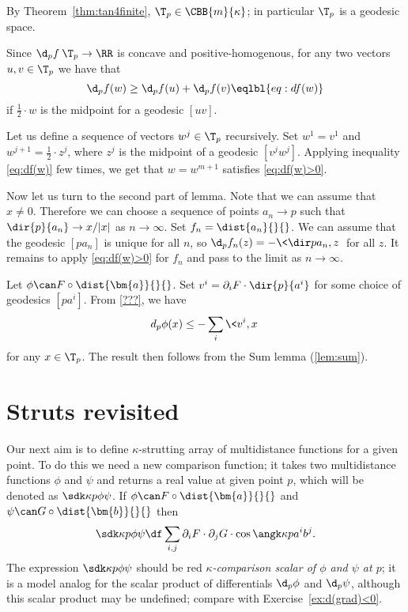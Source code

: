 By Theorem~\ref{thm:tan4finite},
$\T_p\in\CBB{m}{\kappa}$; 
in particular $\T_p$ is a geodesic space.

Since $\d_pf\:\T_p\to\RR$ is concave and positive-homogenous,
for any two vectors $u,v\in \T_p$ we have that 
\[\d_pf(w)\ge \d_pf(u) + \d_pf(v)
\eqlbl{eq:df(w)}\]
if $\tfrac12\cdot w$ is the midpoint for a geodesic $[uv]$.

Let us define a sequence of vectors $w^j\in\T_p$ recursively.
Set $w^1=v^1$ 
and $w^{j+1}=\tfrac12\cdot z^{j}$,
where $z^j$ is the midpoint of a geodesic $[v^j w^j]$.
Applying inequality \ref{eq:df(w)} few times, 
we get that $w=w^{m+1}$ satisfies \ref{eq:df(w)>0}.

Now let us turn to the second part of lemma.
Note that we can assume that $x\ne 0$.
Therefore we can choose a sequence of points $a_n\to p$ such that $\dir{p}{a_n}\to x/|x|$ as $n\to\infty$.
Set $f_n=\dist{a_n}{}{}$.
We can assume that the geodesic $[pa_n]$ is unique for all $n$,
so $\d_pf_n(z)=-\<\dir p{a_n},z\>$ for all $z$.
It remains to apply \ref{eq:df(w)>0} for $f_n$
and pass to the limit as $n\to\infty$.
\qeds

Let $\phi\can F\circ\dist{\bm{a}}{}{}$.
Set $v^i=\partial_i F\cdot\dir{p}{a^i}$
for some choice of geodesics $[pa^i]$.
From \ref{???}, we have
\[d_p\phi(x)\le -\sum_i\<v^i,x\>\] 
for any $x\in\T_p$.
The result then follows from the Sum lemma (\ref{lem:sum}).
\qeds


\section{Struts revisited}

Our next aim is to define
$\kappa$-strutting array of multidistance functions for a given point.
To do this we need a new comparison function;
it takes two multidistance functions $\phi$ and $\psi$ and returns a real value at given point $p$,
which will be denoted as 
$\sdk\kappa{p}{\phi}{\psi}$.
If $\phi\can F\circ\dist{\bm{a}}{}{}$ 
and $\psi\can G\circ\dist{\bm{b}}{}{}$
then 
$$\sdk\kappa{p}{\phi}{\psi}
\df
\sum_{i,j}\partial_iF\cdot\partial_jG\cdot \cos\angk\kappa p{a^i}{b^j}.$$
The expression $\sdk\kappa{p}{\phi}{\psi}$
should be red \emph{$\kappa$-comparison scalar of $\phi$ and $\psi$ at $p$};
it is a model analog for the scalar product of differentials $\d_p\phi$ and $\d_p\psi$,
although this scalar product may be undefined;
compare with Exercise~\ref{ex:d(grad)<0}.


